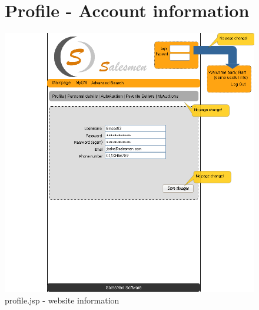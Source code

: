 \documentclass[salesmen, twoside]{../../../templates/latex/2009/softproj}
\begin{document}
\begin{projdoc}
\begin{figure}
\section{Profile - Account information}
\label{fig_prototype_account_info}
\includegraphics[width=15cm]{../../img/SM_mySM_profile.png}
\caption{profile.jsp - website information}
\end{figure}

\end{projdoc}
\end{document}
